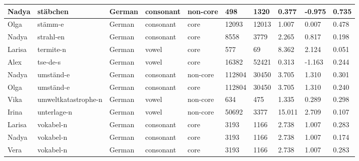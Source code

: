 \begin{longtable}{|p{1.2cm}|p{3cm}|p{1cm}|p{1.5cm}|p{1.5cm}|R{1.2cm}|R{1cm}|R{1cm}|R{0.8cm}|R{0.8cm}|}
Nadya     & st\"{a}bchen           & German        & consonant        & non-core  & 498          & 1320           & 0.377                 & -0.975            & 0.735        \\ \hline
Olga      & st\"{a}mm-e            & German        & consonant        & core      & 12093        & 12013          & 1.007                 & 0.007             & 0.478        \\ \hline
Nadya     & strahl-en              & German        & consonant        & core      & 8558         & 3779           & 2.265                 & 0.817             & 0.198        \\ \hline
Larisa    & termite-n              & German        & vowel            & core      & 577          & 69             & 8.362                 & 2.124             & 0.051        \\ \hline
Alex      & tse-de-s               & German        & vowel            & core      & 16382        & 52421          & 0.313                 & -1.163            & 0.244        \\ \hline
Nadya     & umst\"{a}nd-e          & German        & consonant        & non-core  & 112804       & 30450          & 3.705                 & 1.310             & 0.301        \\ \hline
Olga      & umst\"{a}nd-e          & German        & consonant        & core      & 112804       & 30450          & 3.705                 & 1.310             & 0.240        \\ \hline
Vika      & umweltkatastrophe-n    & German        & vowel            & non-core  & 634          & 475            & 1.335                 & 0.289             & 0.298        \\ \hline
Irina     & unterlage-n            & German        & vowel            & non-core  & 50692        & 3377           & 15.011                & 2.709             & 0.107        \\ \hline
Larisa    & vokabel-n              & German        & consonant        & core      & 3193         & 1166           & 2.738                 & 1.007             & 0.283        \\ \hline
Nadya     & vokabel-n              & German        & consonant        & core      & 3193         & 1166           & 2.738                 & 1.007             & 0.174        \\ \hline
Vera      & vokabel-n              & German        & consonant        & core      & 3193         & 1166           & 2.738                 & 1.007             & 0.283        \\ \hline

\end{longtable}
